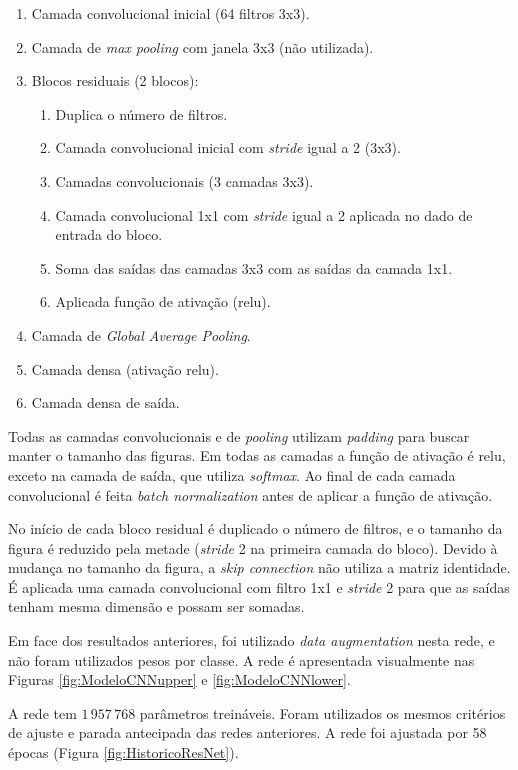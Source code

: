 \documentclass[final,5p]{elsarticle}
\numberwithin{equation}{section}
\begin{document}
    \begin{enumerate}
        \item Camada convolucional inicial (64 filtros 3x3).
        \item Camada de \emph{max pooling} com janela 3x3 (não utilizada).
        \item Blocos residuais (2 blocos):
        \begin{enumerate}
            \item Duplica o número de filtros.
            \item Camada convolucional inicial com \emph{stride} igual a 2 (3x3).
            \item Camadas convolucionais (3 camadas 3x3).
            \item Camada convolucional 1x1 com \emph{stride} igual a 2 aplicada no dado de entrada do bloco.
            \item Soma das saídas das camadas 3x3 com as saídas da camada 1x1.
            \item Aplicada função de ativação (relu).
        \end{enumerate}
        \item Camada de \emph{Global Average Pooling}.
        \item Camada densa (ativação relu).
        \item Camada densa de saída.
    \end{enumerate}

    Todas as camadas convolucionais e de \emph{pooling} utilizam \emph{padding} para buscar manter o tamanho das figuras. Em todas as camadas a função de ativação é relu, exceto na camada de saída, que utiliza \emph{softmax}. Ao final de cada camada convolucional é feita \emph{batch normalization} antes de aplicar a função de ativação.

    No início de cada bloco residual é duplicado o número de filtros, e o tamanho da figura é reduzido pela metade (\emph{stride} 2 na primeira camada do bloco). Devido à mudança no tamanho da figura, a \emph{skip connection} não utiliza a matriz identidade. É aplicada uma camada convolucional com filtro 1x1 e \emph{stride} 2 para que as saídas tenham mesma dimensão e possam ser somadas.

    Em face dos resultados anteriores, foi utilizado \emph{data augmentation} nesta rede, e não foram utilizados pesos por classe. A rede é apresentada visualmente nas Figuras \ref{fig:ModeloCNNupper} e \ref{fig:ModeloCNNlower}.

    A rede tem $1\,957\,768$ parâmetros treináveis. Foram utilizados os mesmos critérios de ajuste e parada antecipada das redes anteriores. A rede foi ajustada por 58 épocas (Figura \ref{fig:HistoricoResNet}).
\end{document}
